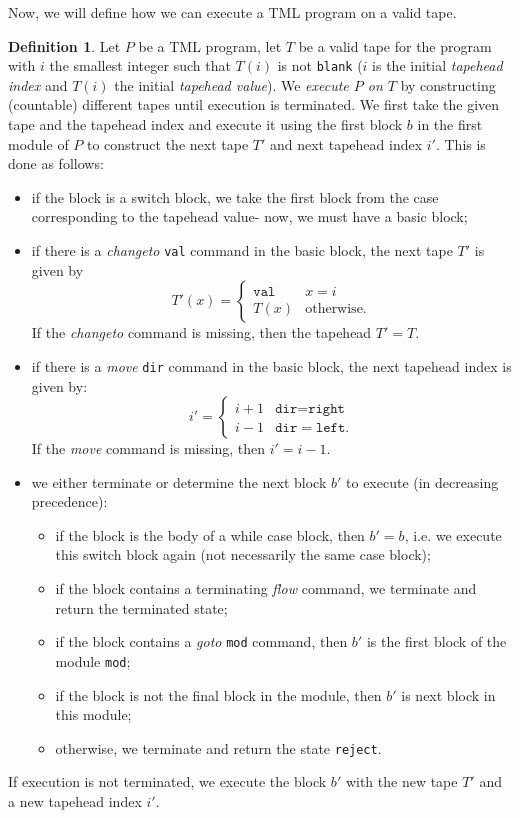 \documentclass{article}
\theoremstyle{definition}
\newtheorem{definition}[rules]{Definition}
\begin{document}
    Now, we will define how we can execute a TML program on a valid tape.
    \begin{definition}
        Let $P$ be a TML program, let $T$ be a valid tape for the program with $i$ the smallest integer such that $T(i)$ is not \texttt{blank} ($i$ is the initial \emph{tapehead index} and $T(i)$ the initial \textit{tapehead value}). We \emph{execute $P$ on $T$} by constructing (countable) different tapes until execution is terminated. We first take the given tape and the tapehead index and execute it using the first block $b$ in the first module of $P$ to construct the next tape $T'$ and next tapehead index $i'$. This is done as follows:
        \begin{itemize}
            \item if the block is a switch block, we take the first block from the case corresponding to the tapehead value- now, we must have a basic block;
            \item if there is a \textit{changeto} \texttt{val} command in the basic block, the next tape $T'$ is given by 
            \[T'(x) = \begin{cases}
                \texttt{val} & x = i \\
                T(x) & \text{otherwise}.
            \end{cases}\]
            If the \textit{changeto} command is missing, then the tapehead $T' = T$.
            \item if there is a \textit{move} \texttt{dir} command in the basic block, the next tapehead index is given by:
            \[i' = \begin{cases}
                i+1 & \texttt{dir} = \texttt{right} \\
                i-1 & \texttt{dir} = \texttt{left}.
            \end{cases}\]
            If the \textit{move} command is missing, then $i' = i-1$.
            \item we either terminate or determine the next block $b'$ to execute (in decreasing precedence):
            \begin{itemize}
                \item if the block is the body of a while case block, then $b' = b$, i.e. we execute this switch block again (not necessarily the same case block); 
                \item if the block contains a terminating \textit{flow} command, we terminate and return the terminated state;
                \item if the block contains a \textit{goto} \texttt{mod} command, then $b'$ is the first block of the module \texttt{mod};
                \item if the block is not the final block in the module, then $b'$ is next block in this module;
                \item otherwise, we terminate and return the state \texttt{reject}.
            \end{itemize}
        \end{itemize}
        If execution is not terminated, we execute the block $b'$ with the new tape $T'$ and a new tapehead index $i'$.
    \end{definition}
\end{document}
